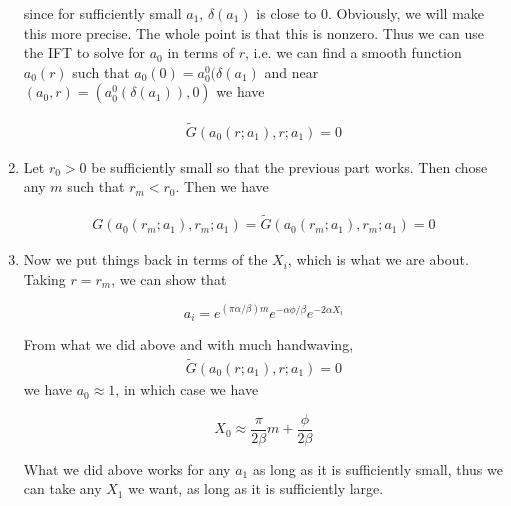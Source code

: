 \documentclass[12pt]{article}
\begin{document}
\begin{enumerate}
since for sufficiently small $a_1$, $\delta(a_1)$ is close to 0. Obviously, we will make this more precise. The whole point is that this is nonzero. Thus we can use the IFT to solve for $a_0$ in terms of $r$, i.e. we can find a smooth function $a_0(r)$ such that $a_0(0) = a_0^0(\delta(a_1)$ and near $(a_0, r) = (a_0^0(\delta(a_1)), 0)$ we have

\begin{align*}
\tilde{G}(a_0(r; a_1), r; a_1) = 0
\end{align*}

\item Let $r_0 > 0$ be sufficiently small so that the previous part works. Then chose any $m$ such that $r_m < r_0$. Then we have

\begin{align*}
G(a_0(r_m; a_1), r_m; a_1) = \tilde{G}(a_0(r_m; a_1), r_m; a_1) = 0
\end{align*}

\item Now we put things back in terms of the $X_i$, which is what we are about. Taking $r = r_m$, we can show that

\[
a_i = e^{(\pi \alpha / \beta) m} e^{-\alpha \phi / \beta}e^{-2 \alpha X_i}
\]

From what we did above and with much handwaving,\begin{align*}
\tilde{G}(a_0(r; a_1), r; a_1) = 0
\end{align*} we have $a_0 \approx 1$, in which case we have

\[
X_0 \approx \frac{\pi}{2 \beta} m + \frac{\phi}{2 \beta}
\]

What we did above works for any $a_1$ as long as it is sufficiently small, thus we can take any $X_1$ we want, as long as it is sufficiently large.

\end{enumerate}
\end{document}
